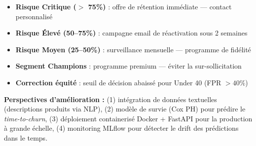 \documentclass[11pt,a4paper]{article}
\begin{document}
\begin{tcolorbox}[title=Recommandations marketing, colframe=successgreen, colback=lightgreen, colbacktitle=successgreen]
\begin{itemize}[noitemsep]
  \item \textbf{Risque Critique ($>$ 75\%)} : offre de rétention immédiate — contact personnalisé
  \item \textbf{Risque Élevé (50--75\%)} : campagne email de réactivation sous 2 semaines
  \item \textbf{Risque Moyen (25--50\%)} : surveillance mensuelle — programme de fidélité
  \item \textbf{Segment Champions} : programme premium — éviter la sur-sollicitation
  \item \textbf{Correction équité} : seuil de décision abaissé pour Under 40 (FPR $> 40\%$)
\end{itemize}
\end{tcolorbox}

\textbf{Perspectives d'amélioration :} (1) intégration de données textuelles (descriptions produits via NLP), (2) modèle de survie (Cox PH) pour prédire le \textit{time-to-churn}, (3) déploiement containerisé Docker + FastAPI pour la production à grande échelle, (4) monitoring MLflow pour détecter le drift des prédictions dans le temps.
\end{document}
